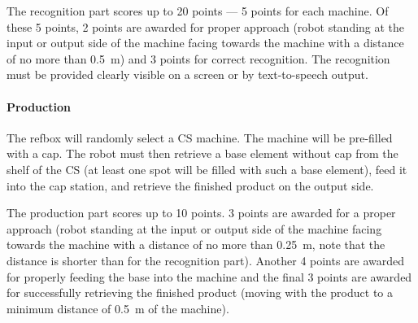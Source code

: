 \documentclass[12pt,twoside]{article}
\begin{document}
The recognition part scores up to 20 points --- 5 points for each
machine. Of these 5 points, 2 points are awarded for proper approach
(robot standing at the input or output side of the machine facing
towards the machine with a distance of no more than \SI{0.5}{\metre})
and 3 points for correct recognition. The recognition must be provided
clearly visible on a screen or by text-to-speech output.

\vspace{-2ex}\paragraph{Production}
The \ac{refbox} will randomly select a \ac{CS} machine. The machine will be
pre-filled with a cap. The robot must then retrieve a base element
without cap from the shelf of the \ac{CS} (at least one spot will be filled
with such a base element), feed it into the cap station, and retrieve
the finished product on the output side.

The production part scores up to 10 points. 3 points are awarded for a
proper approach (robot standing at the input or output side of the
machine facing towards the machine with a distance of no more than
\SI{0.25}{\metre}, note that the distance is shorter than for the
recognition part). Another 4 points are awarded for properly feeding
the base into the machine and the final 3 points are awarded for
successfully retrieving the finished product (moving with the product
to a minimum distance of \SI{0.5}{\metre} of the machine).
\end{document}

